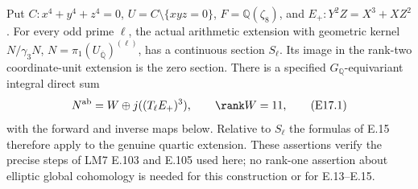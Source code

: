 \begin{proposition}
\label{E-quartic-origin}
Put $C:x^4+y^4+z^4=0$, $U=C\setminus\{xyz=0\}$,
$F=\mathbb Q(\zeta_8)$, and $E_+:Y^2Z=X^3+XZ^2$.
For every odd prime $\ell$, the actual arithmetic
extension with geometric kernel
$N/\gamma_3N$, $N=\pi_1(U_{\overline{\mathbb Q}})^{(\ell)}$,
has a continuous section $S_\ell$. Its image in the
rank-two coordinate-unit extension is the zero section.
There is a specified $G_{\mathbb Q}$-equivariant integral
direct sum
\[
 N^{\rm ab}=W\oplus j((T_\ell E_+)^3),
 \qquad \rank W=11,
 \tag{E17.1}
\]
with the forward and inverse maps below. Relative to
$S_\ell$ the formulas of E.15 therefore apply to the
genuine quartic extension. These assertions verify the
precise steps of LM7 E.103 and E.105 used here; no
rank-one assertion about elliptic global cohomology is
needed for this construction or for E.13--E.15.
\end{proposition}
